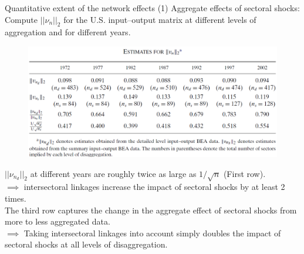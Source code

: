 \documentclass{beamer}
\begin{document}
\begin{frame}{Quantitative extent of the network effects (1)}
    \justifying
Aggregate effects of sectoral shocks: Compute $||\nu_{n}||_2$
for the U.S. input–output matrix at different levels of 
aggregation and for different years.

\begin{figure}[H]
    \includegraphics[scale=0.5]{8}
    \centering
\end{figure}  

$||\nu_{n_d}||_2$ at different years
are roughly twice as large as $1/\sqrt{n}$ (First row).\\
$\implies$ intersectoral linkages increase the impact of sectoral 
shocks by at least 2 times.\\[3pt]

The third row captures the change in the aggregate effect of sectoral shocks
from more to less aggregated data.\\
$\implies$ Taking intersectoral linkages into account
simply doubles the impact of sectoral shocks at all levels of disaggregation.
\end{frame}
\end{document}

